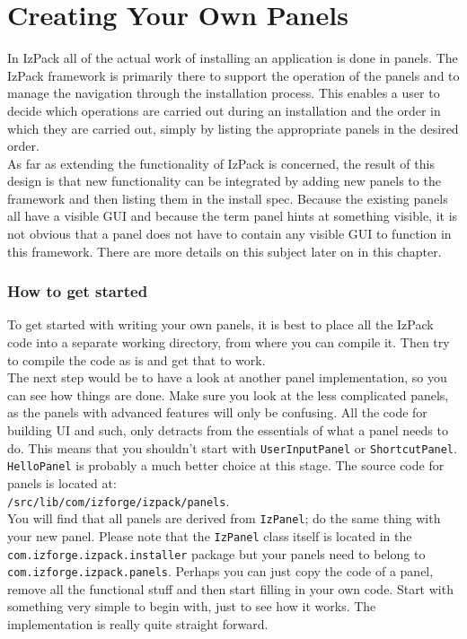 \chapter{Creating Your Own Panels}

In IzPack all of the actual work of installing an application is done in
panels.  The IzPack framework is primarily there to support the operation
of the panels and to manage the navigation through the installation
process.  This enables a user to decide which operations are carried out
during an installation and the order in which they are carried out, simply
by listing the appropriate panels in the desired order.\\

As far as extending the functionality of IzPack is concerned, the result
of this design is that new functionality can be integrated by adding new
panels to the framework and then listing them in the install spec.
Because the existing panels all have a visible GUI and because the term
panel hints at something visible, it is not obvious that a panel does not
have to contain any visible GUI to function in this framework.  There are
more details on this subject later on in this chapter.\\

\subsection{How to get started}

To get started with writing your own panels, it is best to place all the
IzPack code into a separate working directory, from where you can compile
it.  Then try to compile the code as is and get that to work.\\

The next step would be to have a look at another panel implementation, so you can
see how things are done.  Make sure you look at the less complicated panels,
as the panels with advanced features will only be confusing.  All the code
for building UI and such, only detracts from the essentials of what a panel
needs to do.  This means that you shouldn't start with
\texttt{UserInputPanel} or \texttt{ShortcutPanel}.  \texttt{HelloPanel} is
probably a much better choice at this stage.  The source code for panels
is located at:\\

\texttt{/src/lib/com/izforge/izpack/panels}.\\

You will find that all panels are derived from \texttt{IzPanel}; do the
same thing with your new panel.  Please note that the \texttt{IzPanel}
class itself is located in the \texttt{com.izforge.izpack.installer} package
but your panels need to belong to \texttt{com.izforge.izpack.panels}.
Perhaps you can just copy the code of a panel, remove all the functional
stuff and then start filling in your own code.  Start with something very
simple to begin with, just to see how it works.  The implementation is
really quite straight forward.\\

